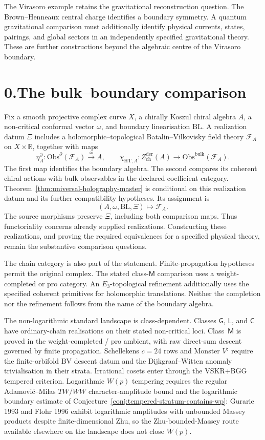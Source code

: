 The Virasoro example retains the gravitational reconstruction question.
The Brown--Henneaux central charge identifies a boundary symmetry.
A quantum gravitational comparison must additionally identify physical
currents, states, pairings, and global sectors in an independently
specified gravitational theory. These are further constructions beyond
the algebraic centre of the Virasoro boundary.

\section*{0.\quad The bulk--boundary comparison}

Fix a smooth projective complex curve $X$, a chirally Koszul chiral
algebra $A$, a non-critical conformal vector $\omega$, and boundary
linearisation $\mathrm{BL}$. A realization datum $\Xi$ includes a
holomorphic--topological Batalin--Vilkovisky field theory $\mathcal F_A$
on $X\times\mathbb R$, together with maps
\[
 \eta_A^\partial\colon\mathrm{Obs}^\partial(\mathcal F_A)
       \xrightarrow{\simeq}A,
 \qquad
 \chi_{\mathrm{HT},A}\colon Z^{\mathrm{der}}_{\mathrm{ch}}(A)
       \longrightarrow\mathrm{Obs}^{\mathrm{bulk}}(\mathcal F_A).
\]
The first map identifies the boundary algebra. The second compares its
coherent chiral actions with bulk observables in the declared coefficient
category. Theorem~\ref{thm:universal-holography-master} is conditional on
this realization datum and its further compatibility hypotheses.
Its assignment is
\[
 (A,\omega,\mathrm{BL},\Xi)\longmapsto\mathcal F_A.
\]
The source morphisms preserve $\Xi$, including both comparison maps.
Thus functoriality concerns already supplied realizations. Constructing
these realizations, and proving the required equivalences for a specified
physical theory, remain the substantive comparison questions.

The chain category is also part of the statement. Finite-propagation
hypotheses permit the original complex. The stated class-$\mathsf M$
comparison uses a weight-completed or pro category. An
$E_3$-topological refinement additionally uses the specified coherent
primitives for holomorphic translations. Neither the completion nor the
refinement follows from the name of the boundary algebra.

The non-logarithmic standard landscape is class-dependent. Classes
$\mathsf G$, $\mathsf L$, and $\mathsf C$ have ordinary-chain
realisations on their stated non-critical loci. Class~$\mathsf M$
is proved in the weight-completed / pro ambient, with raw
direct-sum descent governed by finite propagation. Schellekens
$c=24$ rows and Monster $V^\natural$ require the finite-orbifold BV
descent datum and the Dijkgraaf--Witten anomaly trivialisation in
their strata. Irrational cosets enter through the VSKR+BGG
tempered criterion.
Logarithmic $W(p)$ tempering requires the regular
Adamovi\'c--Milas $TW/WW$ character-amplitude bound and the logarithmic
boundary estimate of
Conjecture~\ref{conj:tempered-stratum-contains-wp}: Gurarie 1993
and Flohr 1996 exhibit logarithmic amplitudes with unbounded Massey
products despite finite-dimensional Zhu, so the Zhu-bounded-Massey
route available elsewhere on the landscape does not close $W(p)$.

